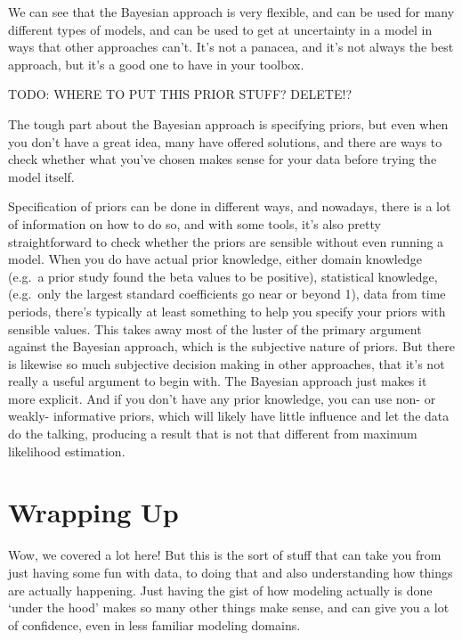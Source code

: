\documentclass[
  letterpaper,
]{krantz}
\begin{document}
We can see that the Bayesian approach is very flexible, and can be used
for many different types of models, and can be used to get at
uncertainty in a model in ways that other approaches can't. It's not a
panacea, and it's not always the best approach, but it's a good one to
have in your toolbox.

TODO: WHERE TO PUT THIS PRIOR STUFF? DELETE!?

The tough part about the Bayesian approach is specifying priors, but
even when you don't have a great idea, many have offered solutions, and
there are ways to check whether what you've chosen makes sense for your
data before trying the model itself.

\begin{tcolorbox}[enhanced jigsaw, colframe=quarto-callout-tip-color-frame, opacityback=0, breakable, left=2mm, rightrule=.15mm, toprule=.15mm, arc=.35mm, leftrule=.75mm, colback=white, bottomrule=.15mm]

Specification of priors can be done in different ways, and nowadays,
there is a lot of information on how to do so, and with some tools, it's
also pretty straightforward to check whether the priors are sensible
without even running a model. When you do have actual prior knowledge,
either domain knowledge (e.g.~a prior study found the beta values to be
positive), statistical knowledge, (e.g.~only the largest standard
coefficients go near or beyond 1), data from time periods, there's
typically at least something to help you specify your priors with
sensible values. This takes away most of the luster of the primary
argument against the Bayesian approach, which is the subjective nature
of priors. But there is likewise so much subjective decision making in
other approaches, that it's not really a useful argument to begin with.
The Bayesian approach just makes it more explicit. And if you don't have
any prior knowledge, you can use non- or weakly- informative priors,
which will likely have little influence and let the data do the talking,
producing a result that is not that different from maximum likelihood
estimation.

\end{tcolorbox}

\section{Wrapping Up}\label{sec-estim-wrap}

Wow, we covered a lot here! But this is the sort of stuff that can take
you from just having some fun with data, to doing that and also
understanding how things are actually happening. Just having the gist of
how modeling actually is done `under the hood' makes so many other
things make sense, and can give you a lot of confidence, even in less
familiar modeling domains.
\end{document}
